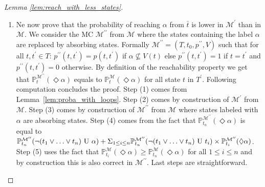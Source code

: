 \documentclass{llncs}
\newcommand{\mc}{\textnormal{MC}}
\newcommand{\Proba}            {\ensuremath{\mathbb{P}}}
\newcommand{\ltlUntil}{\textnormal{ U }}
\newcommand{\ltlExists}{\ensuremath{\Diamond}}
\begin{document}
\begin{proof}[Lemma \ref{lem:reach_with_less_states}]
\begin{enumerate}
	\item Ne now prove that the probability of reaching $\alpha$ from $\bar{t}$
	is lower in $\mathcal{M^\prime}$ than in $\mathcal{M}$.
	We consider the {\mc} $\mathcal{M}^{\prime\prime}$ from $\mathcal{M}$ 
	where the states containing the label $\alpha$ are replaced by absorbing states.
	Formally $\mathcal{M}^{\prime\prime} = (T,t_0,p^{\prime\prime},V)$ such that
	for all $t,t^\prime \in T$:
	$p^{\prime\prime}(t, t^\prime) = p(t, t^\prime)$ if $\alpha \not\subseteq V(t)$
	else $p^{\prime\prime}(t, t^\prime) = 1$ if $t=t^\prime$ and $p^{\prime\prime}(t, t^\prime) = 0$ otherwise.
	By definition of the reachability property we get that
	$\Proba^{\mathcal{M}^{\prime\prime}}_t(\ltlExists \alpha)$ equals to $\Proba^{\mathcal{M}}_t(\ltlExists \alpha)$
	for all state $t$ in $T^\prime$.
	Following computation concludes the proof.
	Step (1) comes from Lemma~\ref{lem:proba_with_loops}.
    Step (2) comes by construction of $\mathcal{M}^\prime$ from $\mathcal{M}$.
	Step (3) comes by construction of $\mathcal{M}^{\prime\prime}$ from $\mathcal{M}$
    where states labeled with $\alpha$ are absorbing states.
    Step (4) comes from the fact that 
    	$\Proba^{\mathcal{M}^{\prime\prime}}_{t_n}(\ltlExists \alpha)$
        is equal to 
        $\Proba^{\mathcal{M}^{\prime\prime}}_{t_n}(\neg(t_1 \lor \ldots \lor t_n) \ltlUntil \alpha) + 
		    \Sigma_{1 \leq i \leq n}
            	\Proba^{\mathcal{M}^{\prime\prime}}_{t_n}(
                	\neg(t_1 \lor \ldots \lor t_n) \ltlUntil t_{i})
                \times \Proba^{\mathcal{M}^{\prime\prime}}_{t_i}(\ltlExists \alpha)$.
	Step (5) uses the fact that $\Proba^{\mathcal{M}}_{t_i}(\ltlExists \alpha) \geq \Proba^{\mathcal{M}}_{t_{n}}(\ltlExists \alpha)$ for all $1 \leq i \leq n$
    and by construction this is also correct in $\mathcal{M}^{\prime\prime}$.
    Last steps are straightforward.
	

\end{enumerate}
\end{proof}
\end{document}
